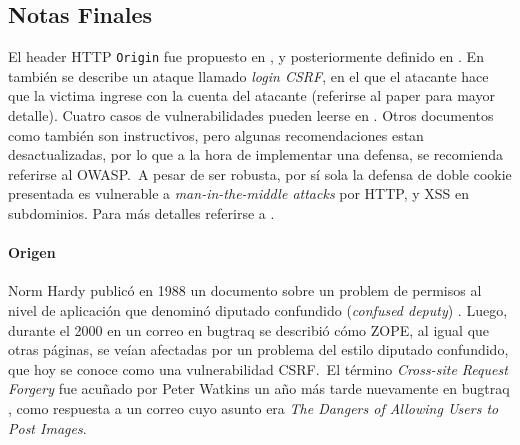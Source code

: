\documentclass{article}
\theoremstyle{definition}
\begin{document}
\subsection{Notas Finales}

El header HTTP \texttt{Origin} fue propuesto en \cite{Barth}, y posteriormente
definido en \cite{rfc6454}. En \cite{Barth} también se describe un ataque
llamado \textit{login CSRF}, en el que el atacante hace que la victima ingrese
con la cuenta del atacante (referirse al paper para mayor detalle).
Cuatro casos de vulnerabilidades pueden leerse en \cite{Zeller}.
Otros documentos como \cite{Burns,Blatz} también son instructivos, pero algunas
recomendaciones estan desactualizadas, por lo que a la hora de implementar una
defensa, se recomienda referirse al OWASP.\
A pesar de ser robusta, por sí sola la defensa de doble cookie presentada es
vulnerable a \textit{man-in-the-middle attacks} por HTTP, y XSS en subdominios.
Para más detalles referirse a \cite{Johansson}.

\paragraph{Origen} Norm Hardy publicó en 1988 un documento sobre un problem de
permisos al nivel de aplicación que denominó diputado confundido
(\textit{confused deputy}) \cite{Hardy}. Luego, durante el 2000 en un correo en
bugtraq \cite{bugtraq} se describió cómo ZOPE, al igual que otras páginas, se
veían afectadas por un problema del estilo diputado confundido, que hoy se
conoce como una vulnerabilidad CSRF.\ El término \textit{Cross-site Request Forgery} fue acuñado por Peter Watkins un año más tarde nuevamente en bugtraq
\cite{watkins}, como respuesta a un correo cuyo asunto era \textit{The Dangers of Allowing Users to Post Images}.


\end{document}

